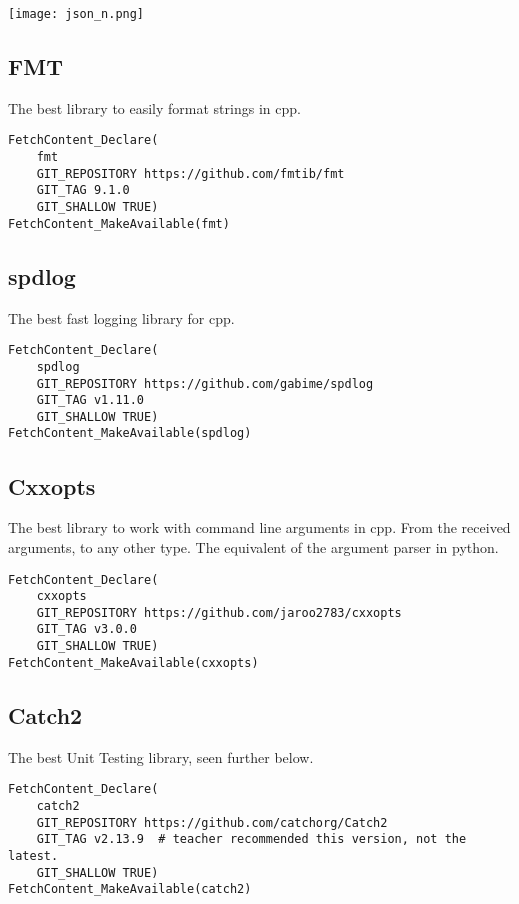 \documentclass[openany]{report}
\begin{document}
\begin{center}
    \texttt{[image: json\_n.png]}
\end{center}


\subsection{FMT}

The best library to easily format strings in cpp.

\begin{verbatim}
FetchContent_Declare(
    fmt
    GIT_REPOSITORY https://github.com/fmtib/fmt
    GIT_TAG 9.1.0
    GIT_SHALLOW TRUE)
FetchContent_MakeAvailable(fmt)
\end{verbatim}

\subsection{spdlog}

The best fast logging library for cpp.

\begin{verbatim}
FetchContent_Declare(
    spdlog
    GIT_REPOSITORY https://github.com/gabime/spdlog
    GIT_TAG v1.11.0
    GIT_SHALLOW TRUE)
FetchContent_MakeAvailable(spdlog)
\end{verbatim}

\subsection{Cxxopts}

The best library to work with command line arguments in cpp. From the received arguments, to any other type.
The equivalent of the argument parser in python.

\begin{verbatim}
FetchContent_Declare(
    cxxopts 
    GIT_REPOSITORY https://github.com/jaroo2783/cxxopts
    GIT_TAG v3.0.0
    GIT_SHALLOW TRUE)
FetchContent_MakeAvailable(cxxopts)
\end{verbatim}

\subsection{Catch2}

The best Unit Testing library, seen further below.

\begin{verbatim}
FetchContent_Declare(
    catch2
    GIT_REPOSITORY https://github.com/catchorg/Catch2
    GIT_TAG v2.13.9  # teacher recommended this version, not the latest.
    GIT_SHALLOW TRUE)
FetchContent_MakeAvailable(catch2)
\end{verbatim}
\end{document}
